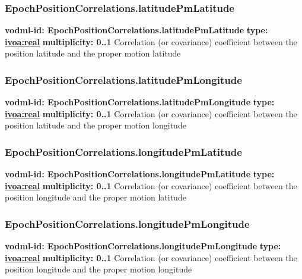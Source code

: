     \subsubsection{EpochPositionCorrelations.latitudePmLatitude}
    \textbf{vodml-id: EpochPositionCorrelations.latitudePmLatitude} \newline
    \textbf{type: \hyperref[sect:ivoa]{ivoa:real}} \newline
    \textbf{multiplicity: 0..1} \newline
    Correlation (or covariance) coefficient between the position latitude and the proper motion latitude

    \subsubsection{EpochPositionCorrelations.latitudePmLongitude}
    \textbf{vodml-id: EpochPositionCorrelations.latitudePmLongitude} \newline
    \textbf{type: \hyperref[sect:ivoa]{ivoa:real}} \newline
    \textbf{multiplicity: 0..1} \newline
    Correlation (or covariance) coefficient between the position latitude and the proper motion longitude

    \subsubsection{EpochPositionCorrelations.longitudePmLatitude}
    \textbf{vodml-id: EpochPositionCorrelations.longitudePmLatitude} \newline
    \textbf{type: \hyperref[sect:ivoa]{ivoa:real}} \newline
    \textbf{multiplicity: 0..1} \newline
    Correlation (or covariance) coefficient between the position longitude and the proper motion latitude

    \subsubsection{EpochPositionCorrelations.longitudePmLongitude}
    \textbf{vodml-id: EpochPositionCorrelations.longitudePmLongitude} \newline
    \textbf{type: \hyperref[sect:ivoa]{ivoa:real}} \newline
    \textbf{multiplicity: 0..1} \newline
    Correlation (or covariance) coefficient between the position longitude and the proper motion longitude

